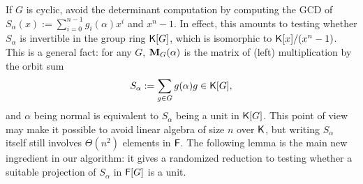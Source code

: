 If $G$ is cyclic, \cite{GatGie90} avoid the determinant computation by
computing the GCD of $S_\alpha(x) := \sum_{i = 0}^{n-1} g_i(\alpha)x^i$ and
$x^n-1$. In effect, this amounts to testing whether $S_\alpha$ is
invertible in the group ring ${\mathsf{K}}[G]$, which is isomorphic to
${\mathsf{K}}[x]/(x^n-1)$. This is a general fact: for any $G$, $\mat M_G(\alpha)$ is
the matrix of (left) multiplication by the orbit sum
$$S_\alpha:= \sum_{g \in G} g(\alpha)g \in {\mathsf{K}}[G],$$ and $\alpha$ being
normal is equivalent to $S_\alpha$ being a unit in ${\mathsf{K}}[G]$. This point of
view may make it possible to avoid linear algebra of size $n$ over ${\mathsf{K}}$,
but writing $S_\alpha$ itself still involves $\Theta(n^2)$ elements in
${\mathsf{F}}$. The following lemma is the main new ingredient in our algorithm: it
gives a randomized reduction to testing whether a suitable projection of
$S_\alpha$ in ${\mathsf{F}}[G]$ is a unit.
 


